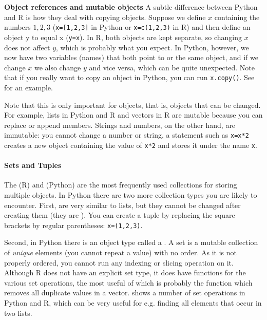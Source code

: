 \begin{feature}\textbf{Object references and mutable objects}
  A subtle difference between Python and R is how they deal with copying objects.
  Suppose we define $x$ containing the numbers $1,2,3$ (\verb|x=[1,2,3]| in Python or \verb|x=c(1,2,3)| in R)
  and then define an object y to equal x (\verb|y=x|).
  In R, both objects are kept separate, so changing $x$ does not affect $y$,
  which is probably what you expect.
  In Python, however, we now have two variables (names) that both point to or  the same object,
  and if we change $x$ we also change $y$ and vice versa, which can be quite unexpected.
  Note that if you really want to copy an object in Python, you can run \verb|x.copy()|.
  See  for an example.

  Note that this is only important for  objects, that is,
  objects that can be changed.
  For example, lists in Python and R and vectors in R are mutable because you can replace or append members.
  Strings and numbers, on the other hand, are immutable:
  you cannot change a number or string, a statement such as \verb|x=x*2| creates a new object containing the value of \verb|x*2| and stores it under the name \verb|x|.

\end{feature}
  

\paragraph{Sets and Tuples}
The  (R) and  (Python) are the most frequently used collections
for storing multiple objects. 
In Python there are two more collection types you are likely to encounter.
First,  are very similar to lists, but they cannot be changed after creating them
(they are ).
You can create a tuple by replacing the square brackets by regular parentheses:
\verb|x=(1,2,3)|. 

Second, in Python there is an object type called a .
A set is a mutable collection of \emph{unique} elements (you cannot repeat a value) with
no order. As it is not properly ordered, you cannot run any indexing
or slicing operation on it.
Although R does not have an explicit set type,
it does have functions for the various set operations,
the most useful of which is probably the function  which removes all duplicate values in a vector.
 shows a number of set operations in Python and R,
which can be very useful for e.g. finding all elements that occur in two lists.

